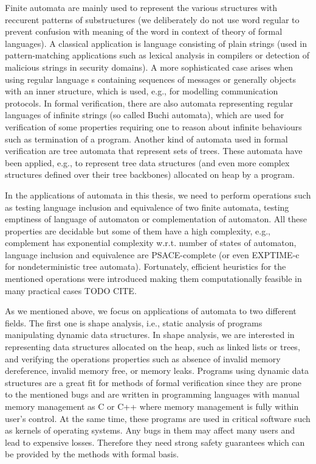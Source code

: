 Finite automata are mainly used to represent the various structures with reccurent patterns of substructures (we deliberately
do not use word regular to prevent confusion with meaning of the word in context of theory of formal languages). 
A classical application is language consisting of plain strings (used in pattern-matching applications
such as lexical analysis in compilers or detection of malicious strings in security domains).
A more sophisticated case arises when using regular language s containing sequences of messages
or generally objects with an inner structure, which is used, e.g., for modelling communication protocols.
In formal verification, there are also automata representing regular languages of infinite strings (so called Buchi automata),
which are used for verification of some properties requiring one to reason about infinite behaviours such as termination of a program.
Another kind of automata used in formal verification are tree automata that represent sets of trees.
These automata have been applied, e.g., to represent tree data structures (and even more complex structures defined over their tree backbones)
allocated on heap by a program.

In the applications of automata in this thesis, we need to perform operations such as testing language inclusion and equivalence
of two finite automata, testing emptiness of language of automaton or complementation of automaton.
All these properties are decidable but some of them have a high complexity,
e.g., complement has exponential complexity w.r.t. number of states of automaton, language inclusion and equivalence are PSACE-complete
(or even EXPTIME-c for nondeterministic tree automata).
Fortunately, efficient heuristics for the mentioned operations were introduced making
them computationally feasible in many practical cases TODO CITE.

As we mentioned above, we focus on applications of automata to two different fields.
The first one is shape analysis, i.e., static analysis of programs manipulating
dynamic data structures.
In shape analysis, we are interested in representing data structures allocated on the heap, such
as linked lists or trees, and verifying the operations properties such as absence of invalid memory
dereference, invalid memory free, or memory leaks.
Programs using dynamic data structures are a great fit for methods of formal verification since 
they are prone to the mentioned bugs and are written in programming
languages with manual memory management as C or C++ where memory management is fully within user's control.
At the same time, these programs are used in critical software such as kernels of operating systems.
Any bugs in them may affect many users and lead to expensive losses.
Therefore they need strong safety guarantees which can be provided by the methods with formal basis.

